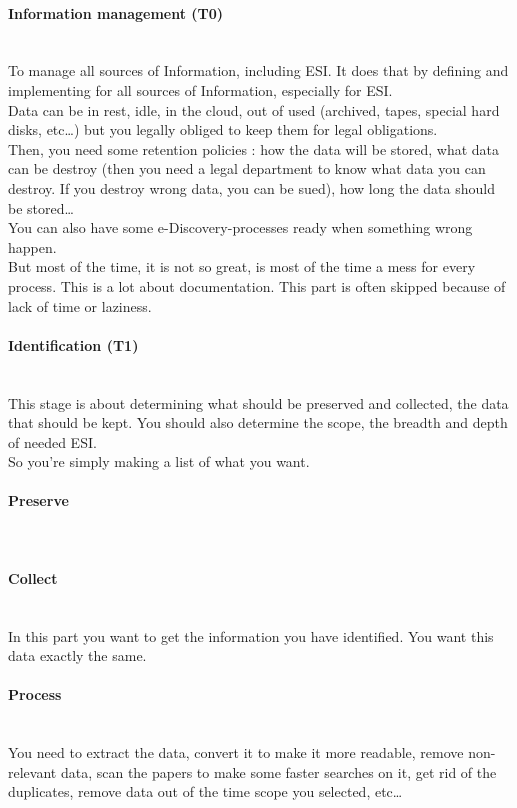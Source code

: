 \paragraph{Information management (T0)}~\\
To manage all sources of Information, including ESI. It does that by defining and implementing for all sources of Information, especially for ESI.\\
Data can be in rest, idle, in the cloud, out of used (archived, tapes, special hard disks, etc\ldots) but you legally obliged to keep them for legal obligations.\\
Then, you need some retention policies : how the data will be stored, what data can be destroy (then you need a legal department to know what data you can destroy. If you destroy wrong data, you can be sued), how long the data should be stored\ldots\\
You can also have some e-Discovery-processes ready when something wrong happen.\\
But most of the time, it is not so great, is most of the time a mess for every process. This is a lot about documentation. This part is often skipped because of lack of time or laziness.\\
\paragraph{Identification (T1)}~\\
This stage is about determining what should be preserved and collected, the data that should be kept. You should also determine the scope, the breadth and depth of needed ESI.\\
So you're simply making a list of what you want.
\paragraph{Preserve}~\\
\paragraph{Collect}~\\
In this part you want to get the information you have identified. You want this data exactly the same.
\paragraph{Process}~\\
You need to extract the data, convert it to make it more readable, remove non-relevant data, scan the papers to make some faster searches on it, get rid of the duplicates, remove data out of the time scope you selected, etc\ldots
